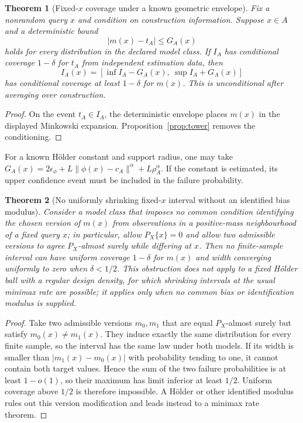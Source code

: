 \documentclass[11pt,a4paper]{article}
\numberwithin{equation}{section}
\newtheorem{theorem}{Theorem}[section]
\theoremstyle{definition}\newtheorem{definition}[theorem]{Definition}
\theoremstyle{remark}\newtheorem{remark}[theorem]{Remark}
\begin{document}
\begin{theorem}[Fixed-\(x\) coverage under a known geometric envelope]\label{thm:fixedknown}
Fix a nonrandom query $x$ and condition on construction information. Suppose $x\in A$ and a deterministic bound
\[
 |m(x)-t_A|\le G_A(x)
\]
holds for every distribution in the declared model class. If $I_A$ has conditional coverage $1-\delta$ for $t_A$ from independent estimation data, then
\[
 I_A(x)=[\inf I_A-G_A(x),\ \sup I_A+G_A(x)]
\]
has conditional coverage at least $1-\delta$ for $m(x)$. This is unconditional after averaging over construction.
\end{theorem}
\begin{proof}
On the event $t_A\in I_A$, the deterministic envelope places $m(x)$ in the displayed Minkowski expansion. Proposition~\ref{prop:tower} removes the conditioning.
\end{proof}
For a known Hölder constant and support radius, one may take $G_A(x)=2\epsilon_\phi+L\|\phi(x)-c_A\|^\alpha+L\rho_A^\alpha$. If the constant is estimated, its upper confidence event must be included in the failure probability.

\begin{theorem}[No uniformly shrinking fixed-$x$ interval without an identified bias modulus]\label{thm:fixedimpossible}
Consider a model class that imposes no common condition identifying the chosen
version of $m(x)$ from observations in a positive-mass neighbourhood of a fixed
query $x$; in particular, allow $P_X\{x\}=0$ and allow two admissible versions
to agree $P_X$-almost surely while differing at $x$. Then no finite-sample
interval can have uniform coverage $1-\delta$ for $m(x)$ and width converging
uniformly to zero when $\delta<1/2$. This obstruction does not apply to a
fixed Hölder ball with a regular design density, for which shrinking intervals
at the usual minimax rate are possible; it applies only when no common bias or
identification modulus is supplied.
\end{theorem}
\begin{proof}
Take two admissible versions $m_0,m_1$ that are equal $P_X$-almost surely but
satisfy $m_0(x)\ne m_1(x)$. They induce exactly the same distribution for every
finite sample, so the interval has the same law under both models. If its width
is smaller than $|m_1(x)-m_0(x)|$ with probability tending to one, it cannot
contain both target values. Hence the sum of the two failure probabilities is
at least $1-o(1)$, so their maximum has limit inferior at least $1/2$.
Uniform coverage above $1/2$ is therefore impossible. A Hölder or other
identified modulus rules out this version modification and leads instead to a
minimax rate theorem.\end{proof}
\end{document}
